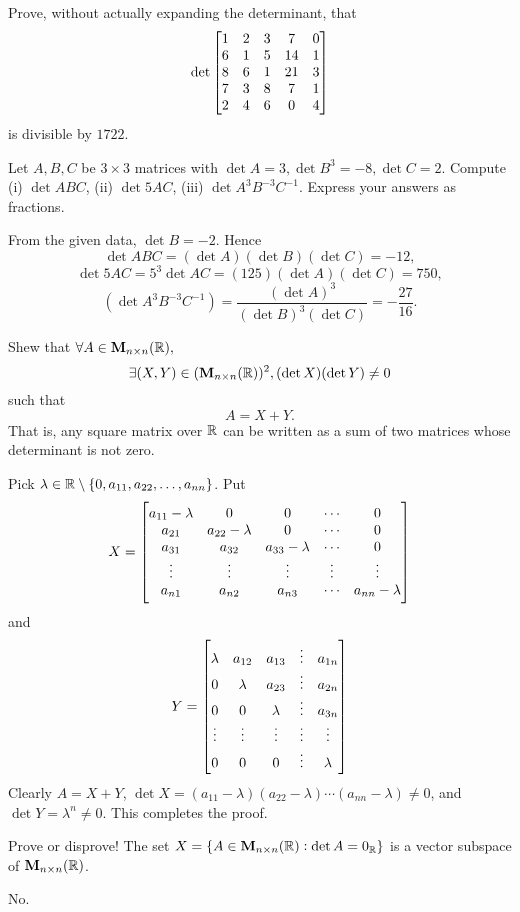 \begin{pro}
Prove, without actually expanding the determinant, that
$$\det \begin{bmatrix}1 & 2 & 3 & 7 & 0 \cr 6 & 1 & 5 & 14 & 1 \cr 8 & 6 & 1 & 21 & 3 \cr 7 & 3 & 8 & 7 & 1 \cr 2 & 4 & 6 & 0 & 4 \cr  \end{bmatrix}$$
is divisible by $1722$.
\end{pro}


\begin{pro} Let $A, B, C$ be $3\times 3$ matrices with $\det A = 3, \det
B^3 = -8,
 \det C = 2$. Compute (i) $\det ABC$, (ii) $\det 5AC$, (iii) $\det
 A^3B^{-3}C^{-1}$. Express your answers as fractions. \begin{answer} From the given data, $\det B = -2.$ Hence
 $$\det ABC = (\det A)(\det B)(\det C) = -12,$$
 $$\det 5AC = 5^3\det AC = (125)(\det A)(\det C) = 750,$$
 $$(\det A^3B^{-3}C^{-1}) = \frac{(\det A)^3}{(\det B)^3(\det C)} = -\frac{27}{16}.$$
\end{answer}
\end{pro}
\begin{pro}
Shew that $\forall A\in\mat{n\times n}{\bbR},$ $$\exists (X, Y)\in
(\mat{n\times n}{\bbR})^2, (\det X)(\det Y)\neq 0$$ such that
$$A = X + Y.$$ That is, any square matrix over $\bbR$ can be written as a sum of two matrices whose determinant is not zero.\begin{answer} Pick $\lambda \in \bbR \setminus \{0,
a_{11}, a_{22}, \ldots , a_{nn}\}$. Put
$$X = \begin{bmatrix} a_{11} - \lambda & 0 & 0 & \cdots &  0 \cr a_{21}  & a_{22} - \lambda & 0 & \cdots & 0 \cr
a_{31}  & a_{32}  & a_{33} - \lambda & \cdots &  0 \cr \vdots &
\vdots & \vdots & \vdots & \vdots \cr a_{n1} & a_{n2} & a_{n3} &
\cdots & a_{nn} - \lambda
\end{bmatrix}$$and
$$Y = \begin{bmatrix}
\lambda & a_{12} & a_{13} & \vdots & a_{1n} \cr   0 & \lambda &
a_{23} & \vdots & a_{2n} \cr
 0 & 0 &
\lambda & \vdots & a_{3n} \cr \vdots & \vdots & \vdots & \vdots &
\vdots \cr
 0 & 0 &
0 & \vdots & \lambda \cr


\end{bmatrix}$$ Clearly  $A = X + Y$, $\det X = (a_{11} - \lambda)(a_{22} -
\lambda)\cdots (a_{nn} - \lambda) \neq 0$, and $\det Y = \lambda^n
\neq 0$. This completes the proof.
\end{answer}
\end{pro}
\begin{pro}
Prove or disprove! The set $X = \{A\in\mat{n\times n}{ \bbR}: \det
A = 0_{\bbR}\}$ is a vector subspace of $\mat{n\times n}{ \bbR}$.
\begin{answer}
No.
\end{answer}
\end{pro}
